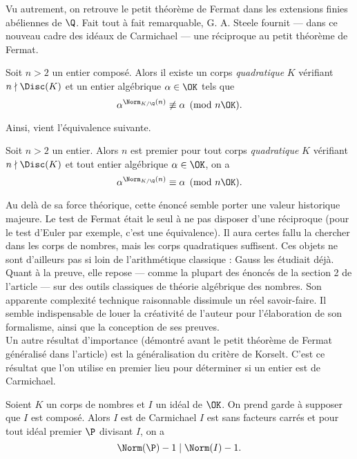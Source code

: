 \documentclass[a4paper, 12pt, oneside]{article}
\begin{document}
Vu autrement, on retrouve le petit théorème de Fermat dans les extensions finies abéliennes de $\Q$. Fait tout à fait remarquable, G. A. Steele fournit — dans ce nouveau cadre des idéaux de Carmichael — une réciproque au petit théorème de Fermat.

\begin{theoreme}
	Soit $n>2$ un entier composé. Alors il existe un corps \emph{quadratique} $K$ vérifiant $n\nmid \Disc(K)$ et un entier algébrique $\alpha \in \OK$ tels que $$\alpha^{\Norm_{K/\Q}(n)} \not\equiv \alpha \pmod{n\OK}.$$
\end{theoreme}

Ainsi, vient l'équivalence suivante.

\begin{theoreme}
	Soit $n>2$ un entier. Alors $n$ est premier \ssi pour tout corps \emph{quadratique} $K$ vérifiant $n\nmid \Disc(K)$ et tout entier algébrique $\alpha \in \OK$, on a $$\alpha^{\Norm_{K/\Q}(n)} \equiv \alpha \pmod{n\OK}.$$
\end{theoreme}

Au delà de sa force théorique, cette énoncé semble porter une valeur historique majeure. Le test de Fermat était le seul à ne pas disposer d'une réciproque (pour le test d'Euler par exemple, c'est une équivalence). Il aura certes fallu la chercher dans les corps de nombres, mais les corps quadratiques suffisent. Ces objets ne sont d'ailleurs pas si loin de l'arithmétique classique : Gauss les étudiait déjà. Quant à la preuve, elle repose — comme la plupart des énoncés de la section 2 de l'article — sur des outils classiques de théorie algébrique des nombres. Son apparente complexité technique raisonnable dissimule un réel savoir-faire. Il semble indispensable de louer la créativité de l'auteur pour l'élaboration de son formalisme, ainsi que la conception de ses preuves. \\

Un autre résultat d'importance (démontré avant le petit théorème de Fermat généralisé dans l'article) est la généralisation du critère de Korselt. C'est ce résultat que l'on utilise en premier lieu pour déterminer si un entier est de Carmichael.

\begin{theoreme}
	Soient $K$ un corps de nombres et $I$ un idéal de $\OK$. On prend garde à supposer que $I$ est composé. Alors $I$ est de Carmichael \ssi $I$ est sans facteurs carrés et pour tout idéal premier $\P$ divisant $I$, on a $$\Norm(\P) - 1 \mid \Norm(I) - 1.$$
\end{theoreme}
\end{document}
